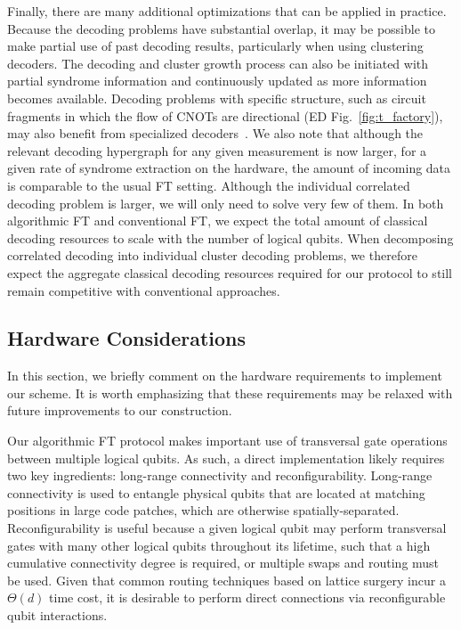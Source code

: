 Finally, there are many additional optimizations that can be applied in practice.
%
Because the decoding problems have substantial overlap, it may be possible to make partial use of past decoding results, particularly when using clustering decoders.
%
The decoding and cluster growth process can also be initiated with partial syndrome information and continuously updated as more information becomes available.
%
Decoding problems with specific structure, such as circuit fragments in which the flow of CNOTs are directional (ED Fig.~\ref{fig:t_factory}), may also benefit from specialized decoders~\cite{beverland2021cost}.
%
We also note that although the relevant decoding hypergraph for any given measurement is now larger, for a given rate of syndrome extraction on the hardware, the amount of incoming data is comparable to the usual FT setting.
%
Although the individual correlated decoding problem is larger, we will only need to solve very few of them.
%
In both algorithmic FT and conventional FT, we expect the total amount of classical decoding resources to scale with the number of logical qubits.
%
When decomposing correlated decoding into individual cluster decoding problems, we therefore expect the aggregate classical decoding resources required for our protocol to still remain competitive with conventional approaches.



\subsection{Hardware Considerations}
\label{methods:hardware}
In this section, we briefly comment on the hardware requirements to implement our scheme.
%
It is worth emphasizing that these requirements may be relaxed with future improvements to our construction.

Our algorithmic FT protocol makes important use of transversal gate operations between multiple logical qubits.
%
As such, a direct implementation likely requires two key ingredients: long-range connectivity and reconfigurability.
%
Long-range connectivity is used to entangle physical qubits that are located at matching positions in large code patches, which are otherwise spatially-separated.
%
Reconfigurability is useful because a given logical qubit may perform transversal gates with many other logical qubits throughout its lifetime, such that a high cumulative connectivity degree is required, or multiple swaps and routing must be used.
%
Given that common routing techniques based on lattice surgery incur a $\Theta(d)$ time cost, it is desirable to perform direct connections via reconfigurable qubit interactions.

